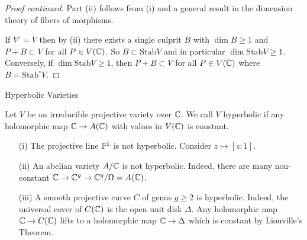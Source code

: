 \documentclass{beamer}
\begin{document}
\begin{frame}
  \begin{proof}[Proof continued]
    Part (ii) follows from (i) and a general result in the 
    dimension theory of fibers of morphisms. 

    If $V^{\circ}=V$ then by (ii) there exists a single culprit $B$ with
    $\dim B\ge 1$ and 
    $P+B\subset V$ for all $P\in V({\mathbb{C}})$. So $B\subset
    \mathrm{Stab} V$ and in particular $\dim \mathrm{Stab}V\ge 1$.
    Conversely, if $\dim \mathrm{Stab} V \ge 1$, then $P+B\subset V$
    for all $P\in V({\mathbb{C}})$ where $B=\mathrm{Stab}^{\circ} V$. 
  \end{proof}
\end{frame}

\begin{frame}{Hyperbolic Varieties}
  \begin{definition}
    Let $V$ be an irreducible projective variety over ${\mathbb{C}}$.
      We call $V$ \alert{hyperbolic} if
      any holomorphic map ${\mathbb{C}} \rightarrow A({\mathbb{C}})$ with values in
      $V({\mathbb{C}})$ is
      constant.
  \end{definition}

  \begin{example}
    \begin{enumerate}
    \item [(i)]    The projective line ${\mathbb{P}}^1$ is \alert{not} hyperbolic. Consider
    $z\mapsto [z:1]$.
    \item[(ii)] An abelian variety $A/{\mathbb{C}}$ is \alert{not} hyperbolic.
      Indeed, there are many non-constant
      ${\mathbb{C}}\rightarrow {\mathbb{C}}^g\rightarrow {\mathbb{C}}^g/\Omega =A({\mathbb{C}})$. 
    \item[(iii)] A smooth projective curve $C$ of genus $g\ge 2$ is
      hyperbolic. Indeed, the universal cover of $C({\mathbb{C}})$ is the open
      unit disk $\Delta$.
      Any holomorphic map ${\mathbb{C}}\rightarrow C({\mathbb{C}})$ lifts to a
      holomorphic map ${\mathbb{C}}\rightarrow\Delta$ which is constant by
      Liouville's Theorem.
    \end{enumerate}
  \end{example}
\end{frame}
\end{document}
